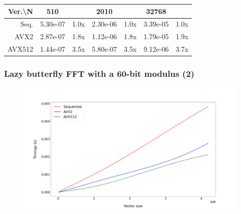 \documentclass[10pt]{beamer}
\begin{document}
\begin{frame}
\begin{table}[h!]
\begin{tabular}{|r|*{3}{c c|}}
            \hline
            \rowcolor{myGray}
            Ver.\textbackslash N & 510 & & 2010 & & 32768 & \\
            \hline
            \cellcolor{myGray} Seq. & 5.30e-07 & 1.0x & 2.30e-06 & 1.0x & 3.39e-05 & 1.0x \\
            \hline
            \cellcolor{myGray} AVX2 & 2.87e-07 & 1.8x & 1.12e-06 & 1.8x & 1.79e-05 & 1.9x \\
            \hline
            \cellcolor{myGray} AVX512 & 1.44e-07 & 3.5x & 5.80e-07 & 3.5x & 9.12e-06 & 3.7x \\
            \hline
        \end{tabular}
    \end{table}
\end{frame}

\begin{frame}
    \frametitle{Lazy butterfly FFT with a 60-bit modulus (2)}

    \begin{figure}[h!]
        \begin{center}
            \includegraphics[width=1\textwidth]{lazy-butterfly_argiope.png}
        \end{center}
    \end{figure}
\end{frame}
\end{document}
